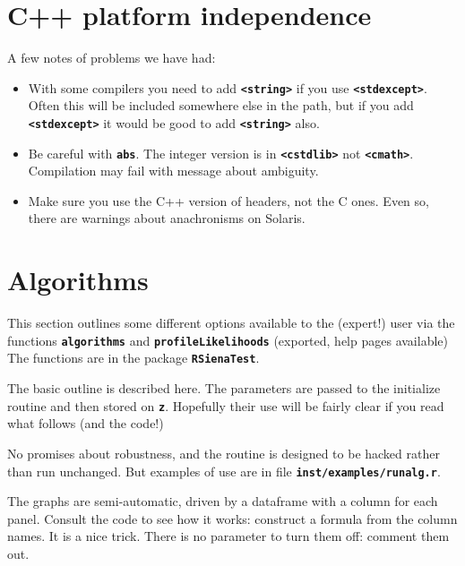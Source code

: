 \documentclass[12pt, a4paper]{article}
\renewcommand{\=}{\,=\,}
\newcommand{\+}{\,+\,}
\newcommand{\sfn}[1]{\textbf{\texttt{#1}}}
\begin{document}
\section{C++ platform independence}
A few notes of problems we have had:
\begin{itemize}
\item With some compilers you need to add \sfn{<string>} if you use
  \sfn{<stdexcept>}. Often this will be included somewhere else in the path, but
  if you add \sfn{<stdexcept>} it would be good to add \sfn{<string>} also.
  \item Be careful with \sfn{abs}. The integer version is in \sfn{<cstdlib>} not
    \sfn{<cmath>}. Compilation may fail with message about ambiguity.
\item Make sure you use the C++ version of headers, not the C ones. Even so,
  there are warnings about anachronisms on Solaris.
\end{itemize}
\section{Algorithms}
This section outlines some different options available to the (expert!) user via
the functions \sfn{algorithms} and \sfn{profileLikelihoods} (exported, help
pages available) The functions are in the
  package \sfn{RSienaTest}.

  The basic outline is described here. The parameters are passed to the
  initialize routine and then stored on \sfn{z}. Hopefully their use will be
  fairly clear if you read what follows (and the code!)

No promises about robustness, and the routine is designed to be hacked rather
than run unchanged. But examples of use are in file \sfn{inst/examples/runalg.r}.

The graphs are semi-automatic, driven by a dataframe with a column for each
panel. Consult the code to see how it works: construct a formula from the column
names. It is a nice trick. There is no parameter to turn them off: comment them
out.

\sfn{}
\end{document}
